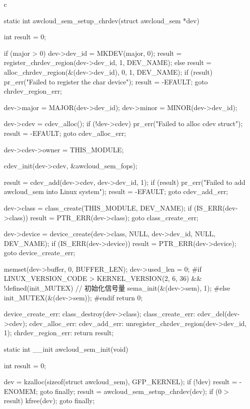 \begin{code-block}{c}
{static int awcloud_sem_setup_chrdev(struct awcloud_sem *dev)
{
        int result = 0;

        if (major > 0) {
                dev->dev_id = MKDEV(major, 0);
                result = register_chrdev_region(dev->dev_id, 1, DEV_NAME);
        } else {
                result = alloc_chrdev_region(&(dev->dev_id), 0, 1, DEV_NAME);
        }
        if (result) {
                pr_err("Failed to register the char device\n");
                result = -EFAULT;
                goto chrdev_region_err;
        }

        dev->major = MAJOR(dev->dev_id);
        dev->minor = MINOR(dev->dev_id);

        dev->cdev = cdev_alloc();
        if (!dev->cdev) {
                pr_err("Failed to alloc cdev struct\n");
                result = -EFAULT;
                goto cdev_alloc_err;
        }

        dev->cdev->owner = THIS_MODULE;

        cdev_init(dev->cdev, &awcloud_sem_fops);

        result = cdev_add(dev->cdev, dev->dev_id, 1);
        if (result) {
                pr_err("Failed to add awcloud_sem into Linux system\n");
                result = -EFAULT;
                goto cdev_add_err;
        }

        dev->class = class_create(THIS_MODULE, DEV_NAME);
        if (IS_ERR(dev->class)) {
                result = PTR_ERR(dev->class);
                goto class_create_err;
        }

        dev->device = device_create(dev->class, NULL,
                dev->dev_id, NULL, DEV_NAME);
        if (IS_ERR(dev->device)) {
                result = PTR_ERR(dev->device);
                goto device_create_err;
        }

        memset(dev->buffer, 0, BUFFER_LEN);
        dev->used_len = 0;
#if LINUX_VERSION_CODE > KERNEL_VERSION(2, 6, 36) && !defined(init_MUTEX)
        // 初始化信号量
        sema_init(&(dev->sem), 1);
#else
        init_MUTEX(&(dev->sem));
#endif
        return 0;

device_create_err:
        class_destroy(dev->class);
class_create_err:
        cdev_del(dev->cdev);
cdev_alloc_err:
cdev_add_err:
        unregister_chrdev_region(dev->dev_id, 1);
chrdev_region_err:
        return result;
}

static int __init awcloud_sem_init(void)
{
        int result = 0;

        dev = kzalloc(sizeof(struct awcloud_sem), GFP_KERNEL);
        if (!dev) {
                result = -ENOMEM;
                goto finally;
        }
        result = awcloud_sem_setup_chrdev(dev);
        if (0 > result) {
                kfree(dev);
                goto finally;
        }

}}
\end{code-block}
